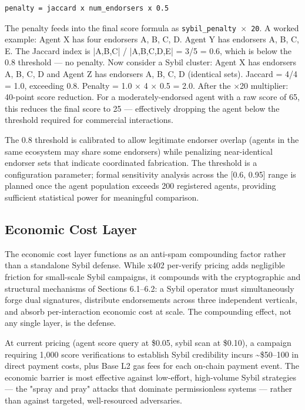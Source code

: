 \begin{lstlisting}[basicstyle=\ttfamily\small]
penalty = jaccard x num_endorsers x 0.5
\end{lstlisting}

The penalty feeds into the final score formula as \texttt{sybil\_penalty $\times$ 20}. A worked example: Agent X has four endorsers {A, B, C, D}. Agent Y has endorsers {A, B, C, E}. The Jaccard index is |{A,B,C}| / |{A,B,C,D,E}| = 3/5 = 0.6, which is below the 0.8 threshold — no penalty. Now consider a Sybil cluster: Agent X has endorsers {A, B, C, D} and Agent Z has endorsers {A, B, C, D} (identical sets). Jaccard = 4/4 = 1.0, exceeding 0.8. Penalty = 1.0 $\times$ 4 $\times$ 0.5 = 2.0. After the $\times$20 multiplier: 40-point score reduction. For a moderately-endorsed agent with a raw score of 65, this reduces the final score to 25 — effectively dropping the agent below the threshold required for commercial interactions.


The 0.8 threshold is calibrated to allow legitimate endorser overlap (agents in the same ecosystem may share some endorsers) while penalizing near-identical endorser sets that indicate coordinated fabrication. The threshold is a configuration parameter; formal sensitivity analysis across the [0.6, 0.95] range is planned once the agent population exceeds 200 registered agents, providing sufficient statistical power for meaningful comparison.


\subsection{Economic Cost Layer}

The economic cost layer functions as an anti-spam compounding factor rather than a standalone Sybil defense. While x402 per-verify pricing adds negligible friction for small-scale Sybil campaigns, it compounds with the cryptographic and structural mechanisms of Sections 6.1–6.2: a Sybil operator must simultaneously forge dual signatures, distribute endorsements across three independent verticals, and absorb per-interaction economic cost at scale. The compounding effect, not any single layer, is the defense.


At current pricing (agent score query at \$0.05, sybil scan at \$0.10), a campaign requiring 1,000 score verifications to establish Sybil credibility incurs \textasciitilde{}\$50–100 in direct payment costs, plus Base L2 gas fees for each on-chain payment event. The economic barrier is most effective against low-effort, high-volume Sybil strategies — the "spray and pray" attacks that dominate permissionless systems — rather than against targeted, well-resourced adversaries.


